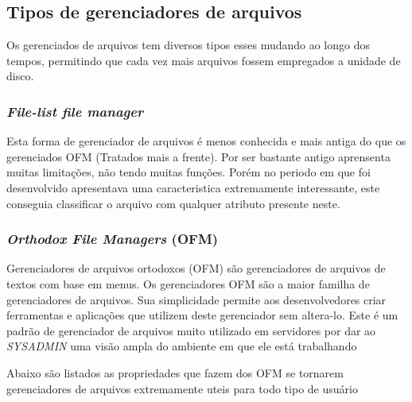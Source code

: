 \documentclass[12pt,a4paper,openany,oneside]{abntex2}
\begin{document}

\subsection{Tipos de gerenciadores de arquivos}

Os gerenciados de arquivos tem diversos tipos esses mudando ao longo dos tempos, permitindo que cada vez mais arquivos fossem empregados a unidade de disco.


\subsubsection{\textit{File-list file manager}}

Esta forma de gerenciador de arquivos é menos conhecida e mais antiga do que os gerenciados OFM  (Tratados mais a frente). Por ser bastante antigo aprensenta muitas limitações, não tendo muitas funções. Porém no periodo em que foi desenvolvido apresentava uma caracteristica extremamente interessante, este conseguia classificar o arquivo com qualquer atributo presente neste.

\subsubsection{\textit{Orthodox File Managers} (OFM)}


Gerenciadores de arquivos ortodoxos (OFM) são gerenciadores de arquivos de textos com base em menus. Os gerenciadores OFM são a maior familha de gerenciadores de arquivos. Sua simplicidade permite aos desenvolvedores criar ferramentas e aplicações que utilizem deste gerenciador sem altera-lo. 
Este é um padrão de gerenciador de arquivos muito utilizado em servidores por dar ao \textit{SYSADMIN} uma visão ampla do ambiente em que ele está trabalhando

Abaixo são listados as propriedades que fazem dos OFM se tornarem gerenciadores de arquivos extremamente uteis para todo tipo de usuário
\end{document}
